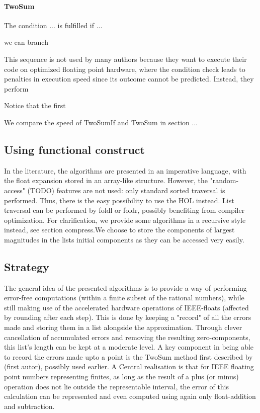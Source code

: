 \documentclass[11pt,a4paper]{article}
\begin{document}
\paragraph{TwoSum}

The condition ... is fulfilled if ...

we can branch 

This sequence is not used by many authors because they want to execute their code on optimized floating point hardware, where the condition check leads to penalties in execution speed since its outcome cannot be predicted. Instead, they perform

Notice that the first 

We compare the speed of TwoSumIf and TwoSum in section ...

\subsection{Using functional construct}
In the literature, the algorithms are presented in an imperative language, with the float expansion stored in an array-like structure. However, the "random-access" (TODO) features are not used: only standard sorted traversal is performed. Thus, there is the easy possibility to use the HOL
instead. List traversal can be performed by foldl or foldr, possibly benefiting from compiler optimization. For clarification, we provide some algorithms in a recursive style instead, see section compress.We choose to store the components of largest magnitudes in the lists initial components as they can be accessed very easily.

\subsection{Strategy}

The general idea of the presented algorithms is to provide a way of performing error-free computations (within a finite subset of the rational numbers), while still making use of the accelerated hardware operations of IEEE-floats (affected by rounding after each step). This is done by keeping a "record" of all the errors made and storing them in a list alongside the approximation. Through clever cancellation of accumulated errors and removing the resulting zero-components, this list's length can be kept at a moderate level.
A key component in being able to record the errors made upto a point is the TwoSum method first described by (first autor), possibly used earlier. A Central realisation is that for IEEE floating point numbers representing finites, as long as the result of a plus (or minus) operation does not lie outside the representable interval, the error of this calculation can be represented and even computed using again only float-addition and subtraction.
\end{document}
